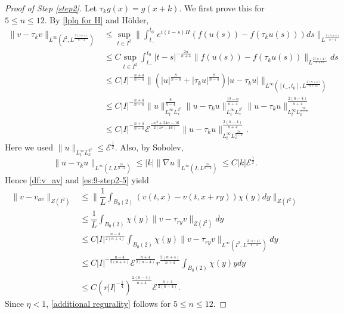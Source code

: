 \documentclass[11pt,a4paper]{article}
\numberwithin{equation}{section}
\begin{document}
\begin{proof}[Proof of Step \ref{step2}]
Let $\tau_{k}g(x) = g(x + k)$.
We first prove this for $5 \leq n \leq 12$. By \eqref{lplq for H} and H\"older,
\begin{align*}
\|v - \tau_{k}v\|_{L^{\infty}(I^{2}, L^{\frac{2(n+4)}{n-4}})}
&\leq \sup_{t \in I^{2}} \|\int_{t_{-}}^{t_{0}}e^{i(t-s)H}\left( f(u(s)) - f(\tau_{k}u(s)) \right) ds\|_{L^{\frac{2(n+4)}{n-4}}} \\
&\leq C \sup_{t \in I^{2}} \int_{t_{-}}^{t_{0}}|t - s|^{-\frac{2n}{n+4}}\|f(u(s)) - f(\tau_{k}u(s))\|_{L^{\frac{2(n+4)}{n+12}}}ds \\
&\leq C |I|^{-\frac{n+4}{n-4}}
\|\left( |u|^{\frac{8}{n-4}} + |\tau_{k}u|^{\frac{8}{n-4}} \right) |u - \tau_{k}u|\|_{L^{\infty}([t_{-}, t_{0}], L^{\frac{2(n+4)}{n+12}})} \\
&\leq C|I|^{-\frac{n+4}{n-4}} \|u\|_{L^{\infty}_{t}L^{2^{\sharp}}_{x}}^{\frac{8}{n-4}}
\|u - \tau_{k}u\|_{L^{\infty}_{t}L^{2^{\sharp}}_{x}}^{\frac{12 - n}{n+4}}
\|u - \tau_{k}u\|_{L^{\infty}_{t}L^{\frac{2n}{n-2}}_{x}}^{\frac{2(n-4)}{n+4}} \\
&\leq C|I|^{-\frac{n+4}{n-4}}\mathcal{E}^{\frac{-n^{2} + 24n -16}{2(n^{2}-16)}}
\|u - \tau_{k}u\|_{L^{\infty}_{t}L^{\frac{2n}{n-2}}_{x}}^{\frac{2(n-4)}{n+4}}.
\end{align*}
Here we used $\|u\|_{L^{\infty}_{t}L^{2^{\sharp}}_{x}} \leq \mathcal{E}^{\frac{1}{2}}$.
Also, by Sobolev,
\begin{equation}\label{es:9-step2-5}
\|u - \tau_{k}u \|_{L^{\infty}(I, L^{\frac{2n}{n-2}})} \leq |k|\|\nabla u\|_{L^{\infty}(I, L^{\frac{2n}{n-2}})} \leq C|k|\mathcal{E}^{\frac{1}{2}}.
\end{equation}
Hence \eqref{df:v_av} and \eqref{es:9-step2-5} yield
\begin{equation}\label{es:9-step2-6}
\begin{aligned}
\|v - v_{av}\|_{Z(I^{2})}
&\leq \|\dfrac{1}{L} \int_{B_{0}(2)} \left( v(t, x) - v(t, x + ry)\right) \chi (y) dy \|_{Z(I^{2})} \\
&\leq \dfrac{1}{L} \int_{B_{0}(2)} \chi (y) \|v - \tau_{ry}v\|_{Z(I^{2})} dy \\
&\leq C|I|^{\frac{n-4}{2(n+4)}} \int_{B_{0}(2)} \chi (y) \|v - \tau_{ry}v\|_{L^{\infty}(I^{2}, L^{\frac{2(n+4)}{n-4}})}dy \\
&\leq C|I|^{-\frac{n-4}{2(n+4)}} \mathcal{E}^{\frac{n+4}{2(n-4)}}r^{\frac{2(n+4)}{n+4}}\int_{B_{0}(2)}  \chi (y) y dy \\
&\leq C\left( r|I|^{-\frac{1}{4}}\right)^{\frac{2(n-4)}{n+4}}\mathcal{E}^{\frac{n+4}{2(n-4)}}.
\end{aligned}
\end{equation}
Since $\eta < 1$, \eqref{additional regurality} follows for $5 \leq n \leq 12$.


\end{proof}
\end{document}
